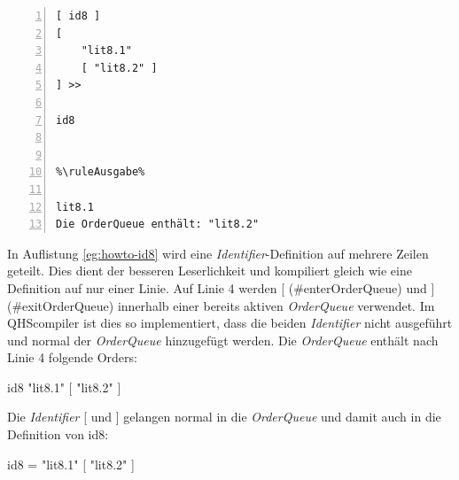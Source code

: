 {
\begin{multicols}{2}
\begin{lstlisting}[language=QHS, label=eg:howto-id8, caption=Beispiel zu doppelter Aktivierung der \textit{OrderQueue}, numbers=left, stepnumber=1]
%\ruleEingabe%
[ id8 ]
[
    "lit8.1"
    [ "lit8.2" ]
] >>

id8


%\ruleAusgabe%

lit8.1
Die OrderQueue enthält: "lit8.2"
\end{lstlisting}
\columnbreak
In Auflistung \ref{eg:howto-id8} wird eine \textit{Identifier}-Definition auf mehrere Zeilen geteilt. Dies dient der besseren Leserlichkeit und kompiliert gleich wie eine Definition auf nur einer Linie.
Auf Linie 4 werden {\selectListingFont [} ({\selectListingFont \#enterOrderQueue}) und {\selectListingFont ]} ({\selectListingFont \#exitOrderQueue}) innerhalb einer bereits aktiven \textit{OrderQueue} verwendet.
Im QHScompiler ist dies so implementiert, dass die beiden \textit{Identifier} nicht ausgeführt und normal der \textit{OrderQueue} hinzugefügt werden. Die \textit{OrderQueue} enthält nach Linie 4 folgende Orders: \break
\centerline{\selectListingFont id8 "lit8.1"{} [ "lit8.2"{} ] }
Die \textit{Identifier} {\selectListingFont [} und {\selectListingFont ]} gelangen normal in die \textit{OrderQueue} und damit auch in die Definition von {\selectListingFont id8}: \break
\centerline{\selectListingFont id8 = "lit8.1"{} [ "lit8.2"{} ] }
\end{multicols}
}

